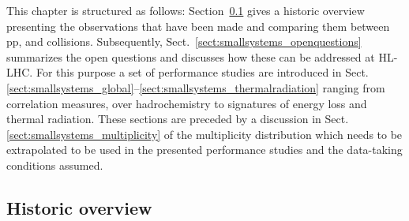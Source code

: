 \documentclass[../report.tex]{subfiles}
\begin{document}
This chapter is structured as follows: Section~\ref{sect:smallsystems_historicoverview} gives a historic overview presenting the observations that have been made and comparing them between pp, \pPb and \PbPb collisions. Subsequently, Sect.~\ref{sect:smallsystems_openquestions} summarizes the open questions and discusses how these can be addressed at HL-LHC. 
For this purpose a set of performance studies are introduced in Sect.\ref{sect:smallsystems_global}--\ref{sect:smallsystems_thermalradiation} ranging from correlation measures, over hadrochemistry to signatures of energy loss and thermal radiation. These sections are preceded by a discussion in Sect.\ref{sect:smallsystems_multiplicity} of the multiplicity distribution which needs to be extrapolated to be used in the presented performance studies and the data-taking conditions assumed.

\subsection{Historic overview}
\label{sect:smallsystems_historicoverview}
\end{document}
